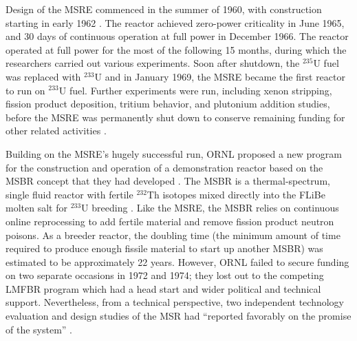 Design of the \gls{MSRE} commenced in the summer of 1960, with construction
starting in early 1962 \cite{haubenreich_experience_1970}. The reactor
achieved zero-power criticality in June 1965, and 30 days of continuous
operation at full power in December 1966. The reactor operated at full power
for the most of the following 15 months, during which the researchers carried
out various experiments. Soon after shutdown, the $^{235}$U fuel was replaced
with $^{233}$U and in January 1969, the \gls{MSRE} became the first reactor to
run on $^{233}$U fuel. Further experiments were run, including xenon
stripping, fission product deposition, tritium behavior, and plutonium
addition studies, before the \gls{MSRE} was permanently shut down to conserve
remaining funding for other related activities \cite{macpherson_molten_1985}.

Building on the \gls{MSRE}'s hugely successful run, \gls{ORNL} proposed a
new program for the construction and operation of a demonstration reactor
based on the \gls{MSBR} concept that they had developed
\cite{macpherson_molten_1985}. The \gls{MSBR} is a thermal-spectrum, single
fluid reactor with fertile $^{232}$Th isotopes mixed directly into the FLiBe
molten salt for $^{233}$U breeding \cite{gehin_liquid_2016}. Like the
\gls{MSRE}, the \gls{MSBR} relies on continuous online reprocessing to add
fertile material and remove fission product neutron poisons. As a breeder
reactor, the doubling time (the minimum amount of time required to produce
enough fissile material to start up another \gls{MSBR}) was estimated to be
approximately 22 years. However, \gls{ORNL} failed to secure funding on two
separate occasions in 1972 and 1974; they lost out to the competing
\gls{LMFBR} program which had a head start and wider political and technical
support. Nevertheless, from a technical perspective, two independent
technology evaluation and design studies of the \gls{MSR} had ``reported
favorably on the promise of the system'' \cite{macpherson_molten_1985}.


